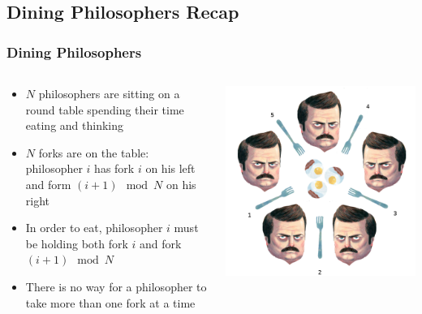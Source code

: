 \documentclass[presentation]{beamer}\mode<presentation>{\usetheme{AMSCesenaPurpleAndGold}}
\begin{document}
\subsection{Dining Philosophers Recap}

\begin{frame}
\frametitle{Dining Philosophers}
    \begin{columns}
        \begin{column}{.49\linewidth}
            \begin{itemize}
                \item $N$ philosophers are sitting on a round table spending their time \alert{eating} and \alert{thinking} 
                
                \item $N$ forks are on the table: philosopher $i$ has fork $i$ on his left and form $(i + 1) \mod N$ on his right
                
                \item In order to eat, philosopher $i$ must be holding \alert{both} fork $i$ and fork $(i + 1) \mod N$
                
                \item There is no way for a philosopher to take more than one fork \alert{at a time}
            \end{itemize}
        \end{column}
        \begin{column}{.49\linewidth}
            \includegraphics[width=\linewidth]{img/dining_pilosophers.png}
        \end{column}
    \end{columns}
\end{frame}
\end{document}

